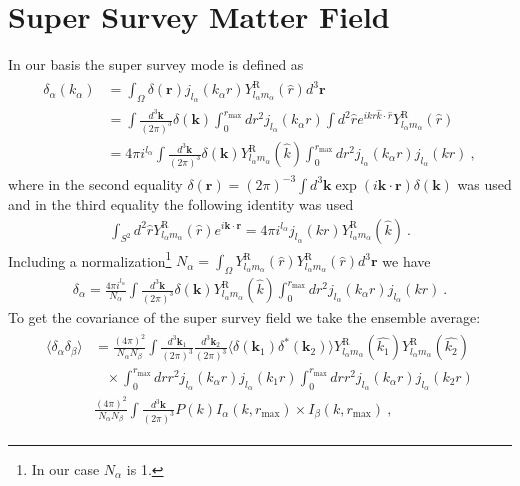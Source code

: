 \documentclass[11pt, oneside]{article}   	%
\newcommand{\sph}[2]{Y^\text{R}_{l_#1 m_#1}(\hat{#2})}
\newcommand{\jl}[1]{j_{l_#1}}
\newcommand{\dk}{\frac{ d^3 \mathbf{k}}{(2 \pi)^3}}
\newcommand{ \dkv}[1]{\frac{ d^3 \mathbf{k}_{#1}}{(2 \pi)^3}}
\begin{document}
\section{Super Survey Matter Field}
In our basis the super survey mode is defined as 
\begin{align} 
\begin{split} 
\delta_\alpha(k_\alpha)& = \int_\Omega \delta(\mathbf{r}) \jl{\alpha}(k_\alpha r) \sph{\alpha}{r} d^3 \mathbf{r}  \\
& = \int \dk \delta(\mathbf{k}) \int_0^{r_\text{max}} dr^2 \jl{\alpha}(k_\alpha r) \int d^2 \hat{r} e^{ikr \hat{k} \cdot \hat{r}} \sph{\alpha}{r} \\
& =4 \pi i^{l_\alpha}\int  \dk \delta(\mathbf{k})  \sph{\alpha}{k}  \int_0^{r_\text{max}} dr^2 \jl{\alpha}(k_\alpha r) \jl{\alpha}(kr)  ~,
\end{split} 
\end{align} 
where in the second equality $\delta(\mathbf{r})=(2\pi)^{-3} \int d^3 \mathbf{k} \exp(i \mathbf{k} \cdot \mathbf{r}) \delta(\mathbf{k})$ was used and in the third equality the following identity was used 
\begin{align} \int_{S^2} d^2 \hat{r} \sph{\alpha}{r} e^{i \mathbf{k} \cdot \mathbf{r}} = 4 \pi i^{l_\alpha} j_{l_\alpha}(k r)\sph{\alpha}{k}~.
\end{align}
Including a normalization\footnote{In our case $N_\alpha$ is 1.} $N_\alpha= \int_\Omega \sph{\alpha}{r} \sph{\alpha}{r} d^3 \mathbf{r} $ we have
\begin{align} 
\delta_\alpha= \frac{4 \pi i^{l_\alpha}}{N_\alpha} \int  \dk \delta(\mathbf{k})  \sph{\alpha}{k}  \int_0^{r_\text{max}} dr^2 \jl{\alpha}(k_\alpha r) \jl{\alpha}(kr)  ~.
\end{align} 
To get the covariance of the super survey field we take the ensemble average:
\begin{align} 
\begin{split} 
\langle \delta_\alpha \delta_\beta \rangle &= \frac{ (4 \pi)^2}{N_\alpha N_\beta} \int  \dkv{1} \dkv{2} \langle \delta(\mathbf{k}_1) \delta^*(\mathbf{k}_2) \rangle \sph{\alpha}{k_1} \sph{\alpha}{k_2} \\
& \;\;\; \times   \int_0^{r_\text{max}}  dr r^2 \jl{\alpha}(k_\alpha r) \jl{\alpha}( k_1 r) \int_0^{r_\text{max}}  dr r^2 \jl{\alpha}(k_\alpha r) \jl{\alpha}( k_2 r)  \\
& \frac{ (4 \pi)^2}{N_\alpha N_\beta} \int \dk P(k) I_\alpha(k, r_\text{max}) \times I_\beta(k, r_\text{max})~,
\end{split} 
\end{align} 
\end{document}
